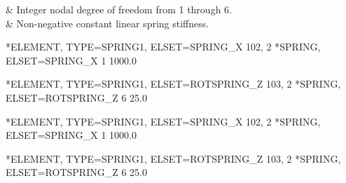 \begin{keyworddata}
 & Integer nodal degree of freedom from 1 through 6. \\
 & Non-negative constant linear spring stiffness. \\
\end{keyworddata}

\exampleheading
\begin{dialectexamples}
\begin{femasterdeck}
*ELEMENT, TYPE=SPRING1, ELSET=SPRING_X
102, 2
*SPRING, ELSET=SPRING_X
1
1000.0

*ELEMENT, TYPE=SPRING1, ELSET=ROTSPRING_Z
103, 2
*SPRING, ELSET=ROTSPRING_Z
6
25.0
\end{femasterdeck}
\begin{abaqusdeck}
*ELEMENT, TYPE=SPRING1, ELSET=SPRING_X
102, 2
*SPRING, ELSET=SPRING_X
1
1000.0

*ELEMENT, TYPE=SPRING1, ELSET=ROTSPRING_Z
103, 2
*SPRING, ELSET=ROTSPRING_Z
6
25.0
\end{abaqusdeck}
\end{dialectexamples}
